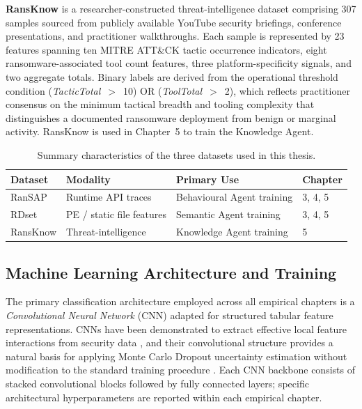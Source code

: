 \textbf{RansKnow} is a researcher-constructed threat-intelligence dataset comprising 307
samples sourced from publicly available YouTube security briefings, conference presentations,
and practitioner walkthroughs.
Each sample is represented by 23 features spanning ten MITRE ATT\&CK tactic occurrence
indicators, eight ransomware-associated tool count features, three platform-specificity
signals, and two aggregate totals.
Binary labels are derived from the operational threshold condition
(\emph{Tactic\textunderscore Total}~$>$~10) OR (\emph{Tool\textunderscore Total}~$>$~2),
which reflects practitioner consensus on the minimum tactical breadth and tooling complexity
that distinguishes a documented ransomware deployment from benign or marginal activity.
RansKnow is used in Chapter~5 to train the Knowledge Agent.

\begin{table}[ht]
\centering
\caption{Summary characteristics of the three datasets used in this thesis.}
\label{tab:datasets}
\begin{tabular}{@{}llll@{}}
\toprule
\textbf{Dataset}  & \textbf{Modality}         & \textbf{Primary Use}              & \textbf{Chapter} \\
\midrule
RanSAP   & Runtime API traces        & Behavioural Agent training        & 3, 4, 5          \\
RDset    & PE / static file features & Semantic Agent training           & 3, 4, 5          \\
RansKnow & Threat-intelligence       & Knowledge Agent training          & 5                \\
\bottomrule
\end{tabular}
\end{table}

\subsection{Machine Learning Architecture and Training}
\label{sec:ml_arch}

The primary classification architecture employed across all empirical chapters is a
\emph{Convolutional Neural Network} (CNN) adapted for structured tabular feature representations.
CNNs have been demonstrated to extract effective local feature interactions from security
data \cite{kolosnjaji2016deep, zahoora2022Deep}, and their convolutional structure provides
a natural basis for applying Monte Carlo Dropout uncertainty estimation without modification
to the standard training procedure \cite{gal2016dropout}.
Each CNN backbone consists of stacked convolutional blocks followed by fully connected layers;
specific architectural hyperparameters are reported within each empirical chapter.

